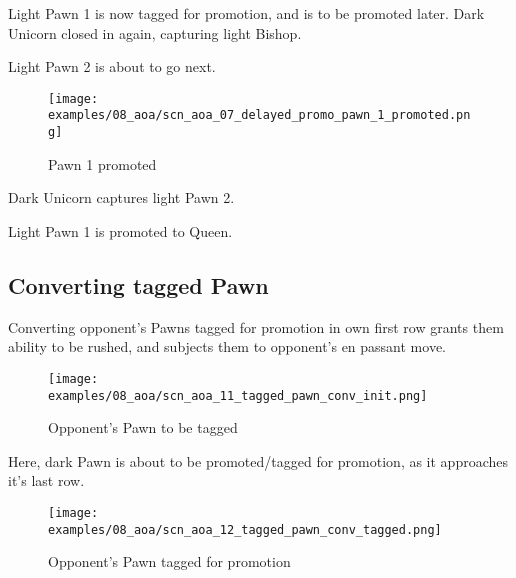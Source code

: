 Light Pawn 1 is now tagged for promotion, and is to be promoted later.
Dark Unicorn closed in again, capturing light Bishop.

Light Pawn 2 is about to go next.

\clearpage %

\noindent
\begin{figure}[h]
\texttt{[image: examples/08\_aoa/scn\_aoa\_07\_delayed\_promo\_pawn\_1\_promoted.png]}
\caption{Pawn 1 promoted}
\label{fig:scn_aoa_07_delayed_promo_pawn_1_promoted}
\end{figure}

Dark Unicorn captures light Pawn 2.

Light Pawn 1 is promoted to Queen.

\clearpage %

\subsection*{Converting tagged Pawn}

Converting opponent's Pawns tagged for promotion in own first row grants them
ability to be rushed, and subjects them to opponent's en passant move.

\noindent
\begin{figure}[h]
\texttt{[image: examples/08\_aoa/scn\_aoa\_11\_tagged\_pawn\_conv\_init.png]}
\caption{Opponent's Pawn to be tagged}
\label{fig:scn_aoa_11_tagged_pawn_conv_init}
\end{figure}

Here, dark Pawn is about to be promoted/tagged for promotion, as it approaches
it's last row.

\clearpage %

\noindent
\begin{figure}[h]
\texttt{[image: examples/08\_aoa/scn\_aoa\_12\_tagged\_pawn\_conv\_tagged.png]}
\caption{Opponent's Pawn tagged for promotion}
\label{fig:scn_aoa_12_tagged_pawn_conv_tagged}
\end{figure}

